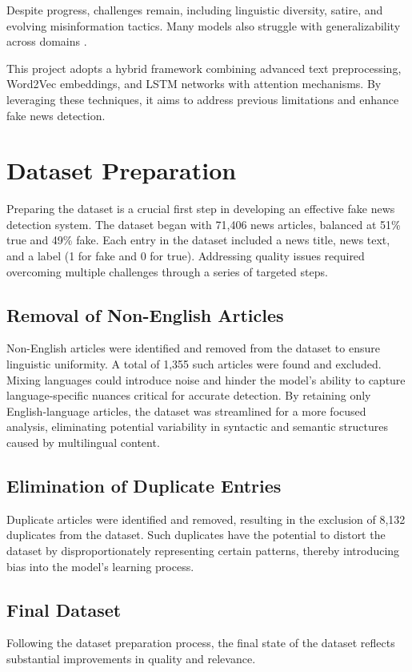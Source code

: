 \documentclass[sn-mathphys-ay, Numbered]{sn-jnl}
\theoremstyle{thmstyleone}%
\theoremstyle{thmstyletwo}%
\theoremstyle{thmstylethree}%
\begin{document}
Despite progress, challenges remain, including linguistic diversity, satire, and evolving misinformation tactics. Many models also struggle with generalizability across domains \citep{Lit_Rev}.

This project adopts a hybrid framework combining advanced text preprocessing, Word2Vec embeddings, and LSTM networks with attention mechanisms. By leveraging these techniques, it aims to address previous limitations and enhance fake news detection.

\section{Dataset Preparation}
Preparing the dataset is a crucial first step in developing an effective fake news detection system. The dataset began with 71,406 news articles, balanced at 51\% true and 49\% fake. Each entry in the dataset included a news title, news text, and a label (1 for fake and 0 for true). Addressing quality issues required overcoming multiple challenges through a series of targeted steps.
\subsection{Removal of Non-English Articles}
Non-English articles were identified and removed from the dataset to ensure linguistic uniformity. A total of 1,355 such articles were found and excluded. Mixing languages could introduce noise and hinder the model's ability to capture language-specific nuances critical for accurate detection. By retaining only English-language articles, the dataset was streamlined for a more focused analysis, eliminating potential variability in syntactic and semantic structures caused by multilingual content.

\subsection{Elimination of Duplicate Entries}
Duplicate articles were identified and removed, resulting in the exclusion of 8,132 duplicates from the dataset. Such duplicates have the potential to distort the dataset by disproportionately representing certain patterns, thereby introducing bias into the model’s learning process.

\subsection{Final Dataset}
Following the dataset preparation process, the final state of the dataset reflects substantial improvements in quality and relevance. 
\end{document}
